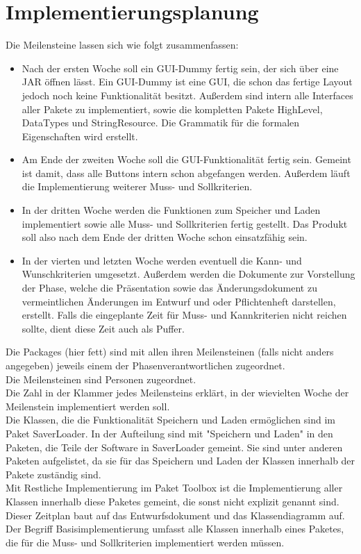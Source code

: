 \documentclass[a4paper]{scrreprt}
\begin{document}
\chapter{Implementierungsplanung}

Die Meilensteine lassen sich wie folgt zusammenfassen: \\
\begin{itemize} 
\item Nach der ersten Woche soll ein GUI-Dummy fertig sein, der sich über eine JAR öffnen lässt. Ein GUI-Dummy ist eine GUI, die schon das fertige Layout jedoch noch keine Funktionalität besitzt. Außerdem sind intern alle Interfaces aller Pakete zu implementiert, sowie die kompletten Pakete HighLevel, DataTypes und StringResource. Die Grammatik für die formalen Eigenschaften wird erstellt.
\item Am Ende der zweiten Woche soll die GUI-Funktionalität fertig sein. Gemeint ist damit, dass alle Buttons intern schon abgefangen werden. Außerdem läuft die Implementierung weiterer Muss- und Sollkriterien. 
\item In der dritten Woche werden die Funktionen zum Speicher und Laden implementiert sowie alle Muss- und Sollkriterien fertig gestellt. Das Produkt soll also nach dem Ende der dritten Woche schon einsatzfähig sein.
\item In der vierten und letzten Woche werden eventuell die Kann- und Wunschkriterien umgesetzt. Außerdem werden die Dokumente zur Vorstellung der Phase, welche die Präsentation sowie das Änderungsdokument zu vermeintlichen Änderungen im Entwurf und oder Pflichtenheft darstellen, erstellt. Falls die eingeplante Zeit für Muss- und Kannkriterien nicht reichen sollte, dient diese Zeit auch als Puffer.
\end{itemize} 
Die Packages (hier fett) sind mit allen ihren Meilensteinen (falls nicht anders angegeben) jeweils einem der Phasenverantwortlichen zugeordnet. \\
Die Meilensteinen sind Personen zugeordnet. \\
Die Zahl in der Klammer jedes Meilensteins erklärt, in der wievielten Woche der Meilenstein implementiert werden soll. \\
Die Klassen, die die Funktionalität Speichern und Laden ermöglichen sind im Paket SaverLoader. In der Aufteilung sind mit "Speichern und Laden" in den Paketen, die Teile der Software in SaverLoader gemeint. Sie sind unter anderen Paketen aufgelistet, da sie für das Speichern und Laden der Klassen innerhalb der Pakete zuständig sind. \\
Mit Restliche Implementierung im Paket Toolbox ist die Implementierung aller Klassen innerhalb diese Paketes gemeint, die sonst nicht explizit genannt sind. \\
Dieser Zeitplan baut auf das Entwurfsdokument und das Klassendiagramm auf. \\
Der Begriff Basisimplementierung umfasst alle Klassen innerhalb eines Paketes, die für die Muss- und Sollkriterien implementiert werden müssen. 
\end{document}
